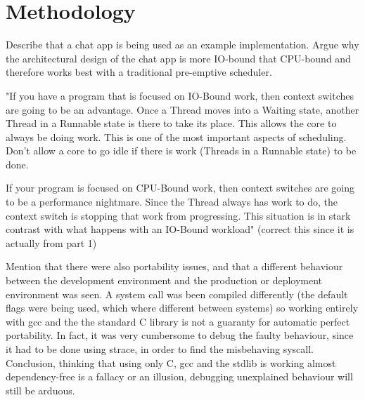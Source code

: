 \section{Methodology}
Describe that a chat app is being used as an example implementation. Argue why the architectural design of the chat app is more IO-bound that CPU-bound \cite{Kennedy2018} and therefore works best with a traditional pre-emptive scheduler.

"If you have a program that is focused on IO-Bound work, then context switches are going to be an advantage. Once a Thread moves into a Waiting state, another Thread in a Runnable state is there to take its place. This allows the core to always be doing work. This is one of the most important aspects of scheduling. Don’t allow a core to go idle if there is work (Threads in a Runnable state) to be done.

If your program is focused on CPU-Bound work, then context switches are going to be a performance nightmare. Since the Thread always has work to do, the context switch is stopping that work from progressing. This situation is in stark contrast with what happens with an IO-Bound workload"\cite{Kennedy2018} (correct this since it is actually from part 1)


Mention that there were also portability issues, and that a different behaviour between the development environment and the production or deployment environment was seen. A system call was been compiled differently (the default flags were being used, which where different between systems) so working entirely with gcc and the the standard C library is not a guaranty for automatic perfect portability. In fact, it was very cumbersome to debug the faulty behaviour, since it had to be done using strace, in order to find the misbehaving syscall. Conclusion, thinking that using only C, gcc and the stdlib is working almost dependency-free is a fallacy or an illusion, debugging unexplained behaviour will still be arduous.